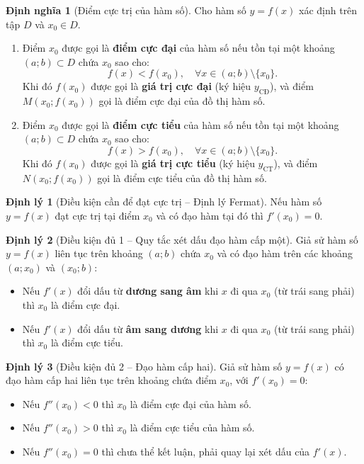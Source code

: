 \documentclass[12pt,a4paper]{article}
\theoremstyle{definition}
\newtheorem{dn}{Định nghĩa}[section]
\newtheorem{dl}{Định lý}[section]
\begin{document}
\begin{dn}[Điểm cực trị của hàm số]
Cho hàm số $y = f(x)$ xác định trên tập $D$ và $x_0 \in D$.
\begin{enumerate}
    \item[a)] Điểm $x_0$ được gọi là \textbf{điểm cực đại} của hàm số nếu tồn tại một khoảng $(a; b) \subset D$ chứa $x_0$ sao cho:
    \[
    f(x) < f(x_0), \quad \forall x \in (a; b) \setminus \{x_0\}.
    \]
    Khi đó $f(x_0)$ được gọi là \textbf{giá trị cực đại} (ký hiệu $y_{\text{CĐ}}$), và điểm $M(x_0; f(x_0))$ gọi là điểm cực đại của đồ thị hàm số.
    \item[b)] Điểm $x_0$ được gọi là \textbf{điểm cực tiểu} của hàm số nếu tồn tại một khoảng $(a; b) \subset D$ chứa $x_0$ sao cho:
    \[
    f(x) > f(x_0), \quad \forall x \in (a; b) \setminus \{x_0\}.
    \]
    Khi đó $f(x_0)$ được gọi là \textbf{giá trị cực tiểu} (ký hiệu $y_{\text{CT}}$), và điểm $N(x_0; f(x_0))$ gọi là điểm cực tiểu của đồ thị hàm số.
\end{enumerate}
\end{dn}

\begin{dl}[Điều kiện cần để đạt cực trị -- Định lý Fermat]
Nếu hàm số $y = f(x)$ đạt cực trị tại điểm $x_0$ và có đạo hàm tại đó thì $f'(x_0) = 0$.
\end{dl}

\begin{dl}[Điều kiện đủ 1 -- Quy tắc xét dấu đạo hàm cấp một]
Giả sử hàm số $y = f(x)$ liên tục trên khoảng $(a; b)$ chứa $x_0$ và có đạo hàm trên các khoảng $(a; x_0)$ và $(x_0; b)$:
\begin{itemize}
    \item Nếu $f'(x)$ đổi dấu từ \textbf{dương sang âm} khi $x$ đi qua $x_0$ (từ trái sang phải) thì $x_0$ là điểm cực đại.
    \item Nếu $f'(x)$ đổi dấu từ \textbf{âm sang dương} khi $x$ đi qua $x_0$ (từ trái sang phải) thì $x_0$ là điểm cực tiểu.
\end{itemize}
\end{dl}

\begin{dl}[Điều kiện đủ 2 -- Đạo hàm cấp hai]
Giả sử hàm số $y = f(x)$ có đạo hàm cấp hai liên tục trên khoảng chứa điểm $x_0$, với $f'(x_0) = 0$:
\begin{itemize}
    \item Nếu $f''(x_0) < 0$ thì $x_0$ là điểm cực đại của hàm số.
    \item Nếu $f''(x_0) > 0$ thì $x_0$ là điểm cực tiểu của hàm số.
    \item Nếu $f''(x_0) = 0$ thì chưa thể kết luận, phải quay lại xét dấu của $f'(x)$.
\end{itemize}
\end{dl}
\end{document}
